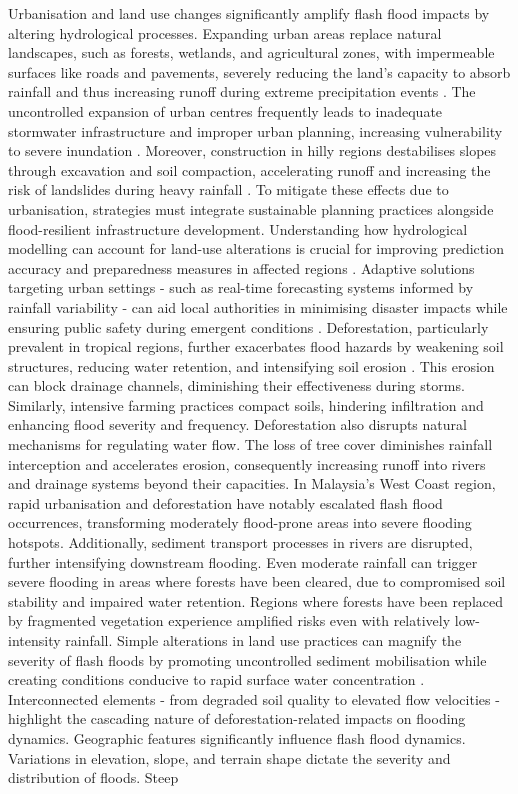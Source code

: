 Urbanisation  and land use changes significantly amplify flash flood impacts by altering hydrological processes. Expanding urban areas replace natural landscapes, such as forests, wetlands, and agricultural zones, with impermeable surfaces like roads and pavements, severely reducing the land's capacity to absorb rainfall and thus increasing runoff during extreme precipitation events \citep{Liu2011, Amponsah2018, Saad2024}. The uncontrolled expansion of urban centres frequently leads to inadequate stormwater infrastructure and improper urban planning, increasing vulnerability to severe inundation \citep{Saad2024, Xing2019a}. Moreover, construction in hilly regions destabilises slopes through excavation and soil compaction, accelerating runoff and increasing the risk of landslides during heavy rainfall \citep{Hinge2024}. To mitigate these effects due to urbanisation, strategies must integrate sustainable planning practices alongside flood-resilient infrastructure development. Understanding how hydrological modelling can account for land-use alterations is crucial for improving prediction accuracy and preparedness measures in affected regions \citep{Martinaitis2023}. Adaptive solutions targeting urban settings - such as real-time forecasting systems informed by rainfall variability - can aid local authorities in minimising disaster impacts while ensuring public safety during emergent conditions \citep{Msigwa2024}\citep{Maqtan2022}. Deforestation, particularly prevalent in tropical regions, further exacerbates flood hazards by weakening soil structures, reducing water retention, and intensifying soil erosion \citep{Hinge2024}. This erosion can block drainage channels, diminishing their effectiveness during storms. Similarly, intensive farming practices compact soils, hindering infiltration and enhancing flood severity and frequency. Deforestation also disrupts natural mechanisms for regulating water flow. The loss of tree cover diminishes rainfall interception and accelerates erosion, consequently increasing runoff into rivers and drainage systems beyond their capacities. In Malaysia's West Coast region, rapid urbanisation and deforestation have notably escalated flash flood occurrences, transforming moderately flood-prone areas into severe flooding hotspots. Additionally, sediment transport processes in rivers are disrupted, further intensifying downstream flooding. Even moderate rainfall can trigger severe flooding in areas where forests have been cleared, due to compromised soil stability and impaired water retention. Regions where forests have been replaced by fragmented vegetation experience amplified risks even with relatively low-intensity rainfall. Simple alterations in land use practices can magnify the severity of flash floods by promoting uncontrolled sediment mobilisation while creating conditions conducive to rapid surface water concentration \citep{Kuksina2020}. Interconnected elements - from degraded soil quality to elevated flow velocities - highlight the cascading nature of deforestation-related impacts on flooding dynamics. Geographic features significantly influence flash flood dynamics. Variations in elevation, slope, and terrain shape dictate the severity and distribution of floods. Steep 